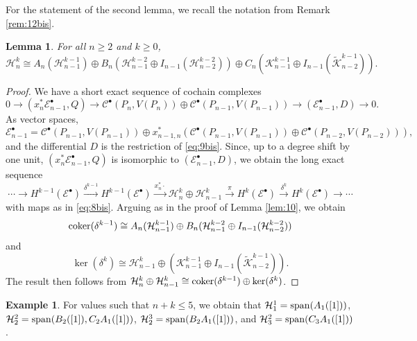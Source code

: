 \documentclass[12pt]{amsart}
\newtheorem{lem}[theorem]{Lemma}
\theoremstyle{definition}
\newtheorem{example}[theorem]{Example}
\begin{document}
For the statement of the second lemma, we recall the notation from Remark \ref{rem:12bis}.

\begin{lem}\label{lem:10bis}
For all $n\ge 2$ and $k\ge 0$,
\begin{equation}\label{eq:12}
\mathcal H_n^k \cong A_n(\mathcal H_{n-1}^{k-1})\oplus B_n(\mathcal H_{n-1}^{k-2}\oplus I_{n-1}(\mathcal H_{n-2}^{k-2}))\oplus C_n (\mathcal K_{n-1}^{k-1}\oplus I_{n-1}( \widetilde{\mathcal K}_{n-2}^{k-1})).
\end{equation}
\end{lem}

\begin{proof}
We have a short exact sequence of cochain complexes
\[0\to (x_n^* \mathcal E_{n-1}^\bullet, Q) \to \mathcal C^\bullet(P_n,V(P_n))\oplus \mathcal C^\bullet(P_{n-1},V(P_{n-1}))\to (\mathcal E_{n-1}^\bullet,D)\to 0.\]
As vector spaces,
\[
 \mathcal E_{n-1}^\bullet = \mathcal C^\bullet(P_{n-1},V(P_{n-1}))\oplus x_{n-1,n}^* \left( \mathcal C^\bullet(P_{n-1},V(P_{n-1}))\oplus\mathcal C^\bullet(P_{n-2},V(P_{n-2}))\right),
\]
and the differential $D$ is the restriction of \eqref{eq:9bis}. Since, up to a degree shift by one unit, $ (x_n^* \mathcal E_{n-1}^\bullet, Q)$ is isomorphic to $(\mathcal E_{n-1}^\bullet,D)$, we obtain the long exact sequence
\[\cdots\rightarrow H^{k-1}(\mathcal E^\bullet)\xrightarrow{\delta^{k-1}}H^{k-1}(\mathcal E^\bullet)\xrightarrow{x_n^*\cdot} \mathcal H^k_n \oplus \mathcal H_{n-1}^k\xrightarrow{\pi} H^k(\mathcal E^\bullet)\xrightarrow{\delta^k} H^{k}(\mathcal E^\bullet)\rightarrow \cdots\]
with maps as in \eqref{eq:8bis}. Arguing as in the proof of Lemma \ref{lem:10}, we obtain
\[
{\rm coker}(\delta^{k-1})\cong A_n(\mathcal H_{n-1}^{k-1})\oplus B_n(\mathcal H_{n-1}^{k-2}\oplus I_{n-1}(\mathcal H_{n-2}^{k-2}))
\]
and
\[
\ker(\delta^k)\cong \mathcal H_{n-1}^{k}\oplus (\mathcal K_{n-1}^{k-1}\oplus I_{n-1}( \widetilde{\mathcal K}_{n-2}^{k-1})).
\]
The result then follows from $\mathcal H^k_n \oplus \mathcal H_{n-1}^k\cong {\rm coker}(\delta^{k-1})\oplus \ker(\delta^k)$.
\end{proof}

\begin{example}\label{ex:11}
For values such that $n+k\le 5$, we obtain that $\mathcal H_1^1={\rm span}(A_1([1]))$, $\mathcal H_2^2={\rm span}(B_2([1]),C_2A_1([1]))$, $\mathcal H_2^3={\rm span}(B_2A_1([1]))$, and $\mathcal H_3^2={\rm span}(C_3A_1([1]))$.   
\end{example}
\end{document}
